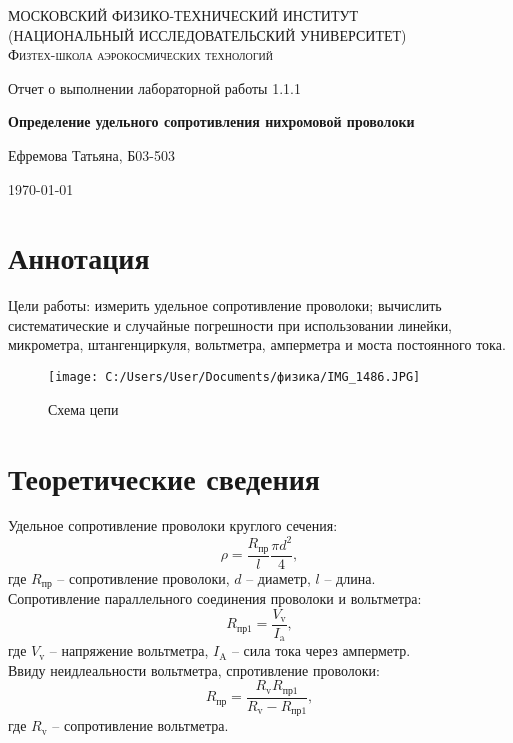 \documentclass[a4paper]{article}
\begin{document}
\begin{titlepage}
	\centering
	{\scshape\Large МОСКОВСКИЙ ФИЗИКО-ТЕХНИЧЕСКИЙ ИНСТИТУТ \\
	(НАЦИОНАЛЬНЫЙ ИССЛЕДОВАТЕЛЬСКИЙ УНИВЕРСИТЕТ)\\ %
    Физтех-школа аэрокосмических технологий}
	
	\vspace{4cm} %
	{\LARGE Отчет о выполнении лабораторной работы 1.1.1}
	
	\vspace{1cm} %
	{\huge\bf Определение удельного сопротивления нихромовой проволоки}
	
	\vspace{1cm} %
	\vfill %
	
    \begin{flushright} %
	   {\LARGE Ефремова Татьяна, Б03-503}
    \end{flushright}
    \vfill

	\today %
\end{titlepage}

\section{Аннотация}
Цели работы: измерить удельное сопротивление проволоки; вычислить систематические и случайные погрешности при использовании линейки, микрометра, штангенциркуля, вольтметра, амперметра и моста постоянного тока.

\begin{wrapfigure}{R}{0.3\textwidth}
    \texttt{[image: C:/Users/User/Documents/физика/IMG\_1486.JPG]}
    \caption{Схема цепи}
\end{wrapfigure}

\section{Теоретические сведения}
Удельное сопротивление проволоки круглого сечения:
\begin{equation}
\rho = \frac{R_\text{пр}}{l}\frac{\pi d^2}{4},
\end{equation} где $R_\text{пр}$ -- сопротивление проволоки, $d$ -- диаметр, $l$ -- длина. \\
Сопротивление параллельного соединения проволоки и вольтметра:
\begin{equation}
R_\text{пр1} = \frac{V_\text{v}}{I_\text{a}},    
\end{equation}
где  $V_\text{v}$ -- напряжение вольтметра, $I_\text{A}$ -- сила тока через амперметр. \\
Ввиду неидлеальности вольтметра, спротивление проволоки:
\begin{equation}
    R_\text{пр} =\frac{R_\text{v}R_\text{пр1}}{R_\text{v}-R_\text{пр1}},
\end{equation}
где $R_\text{v}$ -- сопротивление вольтметра.
\end{document}

